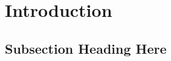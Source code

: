 \documentclass[journal]{IEEEtran}
\begin{document}
%
\IEEEpeerreviewmaketitle



\section{Introduction}

\subsection{Subsection Heading Here}


%
%



%
%
\end{document}
